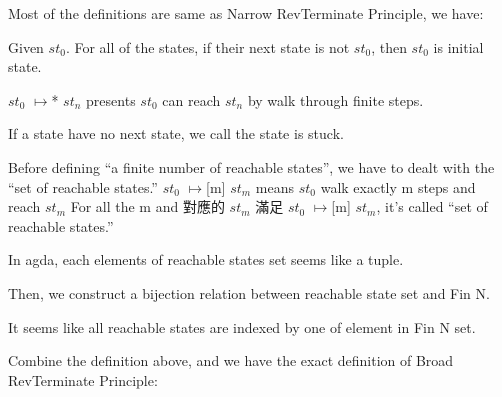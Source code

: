 Most of the definitions are same as Narrow RevTerminate Principle, we have:

Given $st_{0}$.  For all of the states, if their next state is not $st_{0}$, then $st_{0}$ is initial state.


$st_{0}$ $\mapsto$* $st_{n}$ presents $st_{0}$ can reach $st_{n}$ by walk through finite steps.


If a state have no next state, we call the state is stuck.


Before defining ``a finite number of reachable states'', we have to dealt with the ``set of reachable states.''
$st_{0}$ $\mapsto$[m] $st_{m}$ means $st_{0}$ walk exactly m steps and reach $st_{m}$
For all the m and 對應的 $st_{m}$ 滿足 $st_{0}$ $\mapsto$[m] $st_{m}$, it's called ``set of reachable states.''


In agda, each elements of reachable states set seems like a tuple. 


Then, we construct a bijection relation between reachable state set and Fin N.


It seems like all reachable states are indexed by one of element in Fin N set.


Combine the definition above, and we have the exact definition of Broad RevTerminate Principle:

